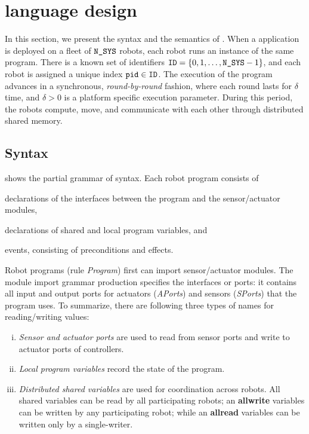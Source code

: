\section{\lgname language design}
\label{sec:language}

In this section, we present the syntax and the semantics of \lgname.
%
%
When a \lgname application is deployed on a fleet of $\texttt{N\_SYS}$ robots, each robot runs an instance of the same program. There is a known set of identifiers $\texttt{ID}=\{0,1,\dots,\texttt{N\_SYS}-1\}$, and each robot is assigned  a unique index $\texttt{pid} \in \texttt{ID}$.
%
The execution of the \lgname program advances in a synchronous, \emph{round-by-round} fashion, where each round lasts for $\delta$ time,
and $\delta >0$ is a platform specific execution parameter.
During this period, the robots compute, move, and
communicate with each other through distributed shared memory.



\subsection{Syntax}\label{sec:syntax}

 shows the partial grammar of \lgname syntax.
Each robot program consists of
\begin{inparaenum}[(a)]
\item declarations of the interfaces between the program and the sensor/actuator modules,
\item declarations of shared and local program variables, and
\item events, consisting of preconditions and effects.
\end{inparaenum}
Robot programs (rule \emph{Program}) first can import sensor/actuator modules.
The module import grammar production specifies the interfaces or ports:
it contains all input and output ports for actuators (\emph{APorts}) and sensors (\emph{SPorts}) that the program uses.
To summarize, there are following three types of names for reading/writing values:
\begin{enumerate}[(i)]
\item \emph{Sensor and actuator ports} are used to read from sensor ports and write to actuator ports of controllers.
\item \emph{Local program variables} record the state of the program.
\item \emph{Distributed shared variables} are used for coordination across robots. All shared variables can be read by all participating robots; an
      \textbf{allwrite} variables can be written by any participating robot; while an
      \textbf{allread} variables can be written only by a single-writer.
\end{enumerate}

